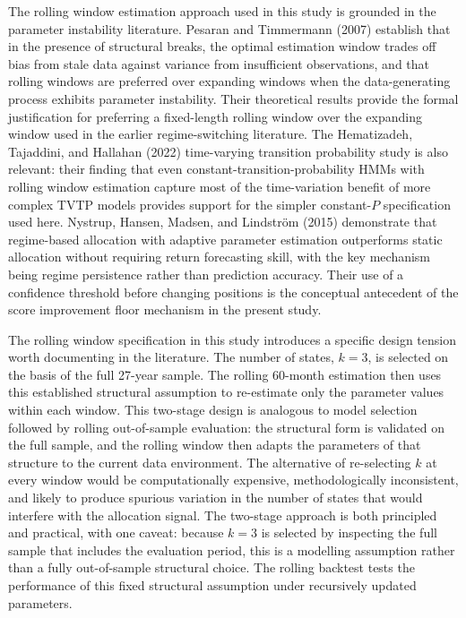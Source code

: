 \documentclass[12pt, a4paper]{article}
\begin{document}
The rolling window estimation approach used in this study is grounded in the parameter
instability literature. Pesaran and Timmermann (2007) establish that in the presence of
structural breaks, the optimal estimation window trades off bias from stale data against
variance from insufficient observations, and that rolling windows are preferred over expanding
windows when the data-generating process exhibits parameter instability. Their theoretical
results provide the formal justification for preferring a fixed-length rolling window over
the expanding window used in the earlier regime-switching literature. The Hematizadeh,
Tajaddini, and Hallahan (2022) time-varying transition probability study is also relevant:
their finding that even constant-transition-probability HMMs with rolling window estimation
capture most of the time-variation benefit of more complex TVTP models provides support for
the simpler constant-$P$ specification used here. Nystrup, Hansen, Madsen, and Lindstr{\"o}m
(2015) demonstrate that regime-based allocation with adaptive parameter estimation outperforms
static allocation without requiring return forecasting skill, with the key mechanism being
regime persistence rather than prediction accuracy. Their use of a confidence threshold before
changing positions is the conceptual antecedent of the score improvement floor mechanism in
the present study.

The rolling window specification in this study introduces a specific design tension worth
documenting in the literature. The number of states, $k=3$, is selected on the basis of the
full 27-year sample. The rolling 60-month estimation then uses this established structural
assumption to re-estimate only the parameter values within each window. This two-stage design
is analogous to model selection followed by rolling out-of-sample evaluation: the structural
form is validated on the full sample, and the rolling window then adapts the parameters of
that structure to the current data environment. The alternative of re-selecting $k$ at every
window would be computationally expensive, methodologically inconsistent, and likely to produce
spurious variation in the number of states that would interfere with the allocation signal.
The two-stage approach is both principled and practical, with one caveat: because $k=3$
is selected by inspecting the full sample that includes the evaluation period, this is a
modelling assumption rather than a fully out-of-sample structural choice. The rolling backtest
tests the performance of this fixed structural assumption under recursively updated parameters.
\end{document}
